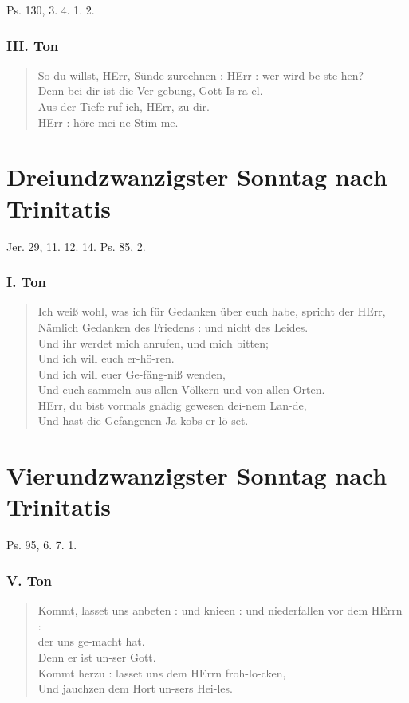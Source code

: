Ps. 130, 3. 4. 1. 2.

\subsubsection{III. Ton}
\begin{verse}
So du willst, HErr, Sünde zurechnen : HErr : wer wird be-ste-hen?\\
Denn bei dir ist die Ver-gebung, Gott Is-ra-el.\\
Aus der Tiefe ruf ich, HErr, zu dir.\\
HErr : höre mei-ne Stim-me.
\end{verse}

\section[Dreiundzwanzigster Sonntag]{Dreiundzwanzigster Sonntag nach Trinitatis}

Jer. 29, 11. 12. 14. Ps. 85, 2.

\subsubsection{I. Ton}
\begin{verse}
Ich weiß wohl, was ich für Gedanken über euch habe, spricht der HErr,\\
Nämlich Gedanken des Friedens : und nicht des Leides.\\
Und ihr werdet mich anrufen, und mich bitten;\\
Und ich will euch er-hö-ren.\\
Und ich will euer Ge-fäng-niß wenden,\\
Und euch sammeln aus allen Völkern und von allen Orten.\\
HErr, du bist vormals gnädig gewesen dei-nem Lan-de,\\
Und hast die Gefangenen Ja-kobs er-lö-set.
\end{verse}

\section[Vierundzwanzigster Sonntag]{Vierundzwanzigster Sonntag nach Trinitatis}

Ps. 95, 6. 7. 1.

\subsubsection{V. Ton}
\begin{verse}
Kommt, lasset uns anbeten : und knieen : und niederfallen vor dem HErrn :\\
der uns ge-macht hat.\\
Denn er ist un-ser Gott.\\
Kommt herzu : lasset uns dem HErrn froh-lo-cken,\\
Und jauchzen dem Hort un-sers Hei-les.
\end{verse}


